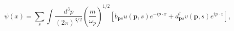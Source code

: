 \begin{equation}
\psi (x)=\sum_{s}\int \frac{d^{3}p}{\left( 2\pi \right) ^{3/2}}\left( \frac{m%
}{\omega _{p}}\right) ^{1/2}\left[ b_{\mathbf{p}s}u\left( \mathbf{p}%
,s\right) e^{-ip\cdot x}+d_{\mathbf{p}s}^{\dagger }v\left( \mathbf{p}%
,s\right) e^{ip\cdot x}\right] ,
\end{equation}

